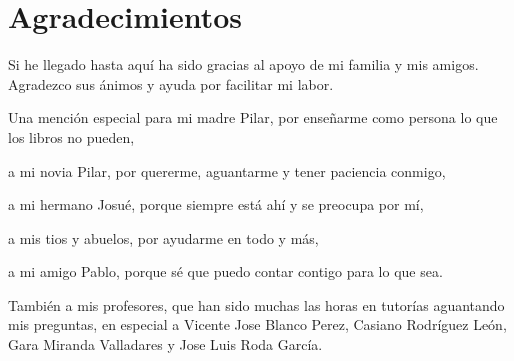 \documentclass[a4paper,14pt]{book}
\begin{document}
	
\chapter*{Agradecimientos}

Si he llegado hasta aquí ha sido gracias al apoyo de mi familia y mis amigos. Agradezco sus ánimos y ayuda por facilitar mi labor.

\vspace*{0.1in}
Una mención especial para mi madre Pilar, por enseñarme como persona lo que los libros no pueden,

\vspace*{0.1in}
a mi novia Pilar, por quererme, aguantarme y tener paciencia conmigo,

\vspace*{0.1in}
a mi hermano Josué, porque siempre está ahí y se preocupa por mí,

\vspace*{0.1in}
a mis tios y abuelos, por ayudarme en todo y más,

\vspace*{0.1in}
a mi amigo Pablo, porque sé que puedo contar contigo para lo que sea.

\vspace*{0.1in}
También a mis profesores, que han sido muchas las horas en tutorías aguantando mis preguntas, en especial a Vicente Jose Blanco Perez, Casiano Rodríguez León, Gara Miranda Valladares y Jose Luis Roda García.
\end{document}
